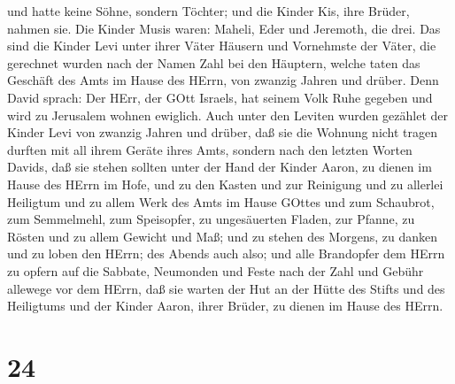 und hatte keine Söhne, sondern Töchter; und die Kinder Kis, ihre Brüder,
nahmen sie.  Die Kinder Musis waren: Maheli, Eder und
Jeremoth, die drei.  Das sind die Kinder Levi unter ihrer
Väter Häusern und Vornehmste der Väter, die gerechnet wurden nach der
Namen Zahl bei den Häuptern, welche taten das Geschäft des Amts im Hause
des HErrn, von zwanzig Jahren und drüber.  Denn David
sprach: Der HErr, der GOtt Israels, hat seinem Volk Ruhe gegeben und
wird zu Jerusalem wohnen ewiglich.  Auch unter den Leviten
wurden gezählet der Kinder Levi von zwanzig Jahren und drüber, daß sie
die Wohnung nicht tragen durften mit all ihrem Geräte ihres Amts,
 sondern nach den letzten Worten Davids,  daß
sie stehen sollten unter der Hand der Kinder Aaron, zu dienen im Hause
des HErrn im Hofe, und zu den Kasten und zur Reinigung und zu allerlei
Heiligtum und zu allem Werk des Amts im Hause GOttes  und
zum Schaubrot, zum Semmelmehl, zum Speisopfer, zu ungesäuerten Fladen,
zur Pfanne, zu Rösten und zu allem Gewicht und Maß;  und zu
stehen des Morgens, zu danken und zu loben den HErrn; des Abends auch
also;  und alle Brandopfer dem HErrn zu opfern auf die
Sabbate, Neumonden und Feste nach der Zahl und Gebühr allewege vor dem
HErrn,  daß sie warten der Hut an der Hütte des Stifts und
des Heiligtums und der Kinder Aaron, ihrer Brüder, zu dienen im Hause
des HErrn.

\hypertarget{section-23}{%
\section{24}\label{section-23}}

